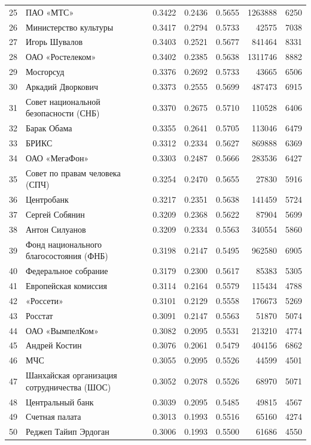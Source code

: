 {\begin{longtable}{r >{\raggedright\arraybackslash}p{4.2cm} S[table-format=1.4] S[table-format=1.4] S[table-format=1.4] r r}
25 & ПАО «МТС» & 0.3422 & 0.2436 & 0.5655 & 1263888 & 6250 \\
26 & Министерство культуры & 0.3417 & 0.2794 & 0.5733 & 42575 & 7038 \\
27 & Игорь Шувалов & 0.3403 & 0.2521 & 0.5677 & 841464 & 8331 \\
28 & ОАО «Ростелеком» & 0.3402 & 0.2385 & 0.5638 & 1311746 & 8882 \\
29 & Мосгорсуд & 0.3376 & 0.2692 & 0.5733 & 43665 & 6506 \\
30 & Аркадий Дворкович & 0.3373 & 0.2555 & 0.5699 & 487473 & 6915 \\
31 & Совет национальной безопасности (СНБ) & 0.3370 & 0.2675 & 0.5710 & 110528 & 6406 \\
32 & Барак Обама & 0.3355 & 0.2641 & 0.5705 & 113046 & 6479 \\
33 & БРИКС & 0.3312 & 0.2334 & 0.5627 & 869888 & 6369 \\
34 & ОАО «МегаФон» & 0.3303 & 0.2487 & 0.5666 & 283536 & 6427 \\
35 & Совет по правам человека (СПЧ) & 0.3254 & 0.2470 & 0.5655 & 27830 & 5916 \\
36 & Центробанк & 0.3217 & 0.2351 & 0.5638 & 141459 & 5724 \\
37 & Сергей Собянин & 0.3209 & 0.2368 & 0.5622 & 87904 & 5699 \\
38 & Антон Силуанов & 0.3209 & 0.2334 & 0.5563 & 340554 & 5860 \\
39 & Фонд национального благосостояния (ФНБ) & 0.3198 & 0.2147 & 0.5495 & 962580 & 6905 \\
40 & Федеральное собрание & 0.3179 & 0.2300 & 0.5617 & 85383 & 5305 \\
41 & Европейская комиссия & 0.3114 & 0.2164 & 0.5579 & 115434 & 4788 \\
42 & «Россети» & 0.3101 & 0.2129 & 0.5558 & 176673 & 5269 \\
43 & Росстат & 0.3091 & 0.2147 & 0.5563 & 51870 & 5074 \\
44 & ОАО «ВымпелКом» & 0.3082 & 0.2095 & 0.5531 & 213210 & 4774 \\
45 & Андрей Костин & 0.3076 & 0.2061 & 0.5479 & 404156 & 6862 \\
46 & МЧС & 0.3055 & 0.2095 & 0.5526 & 44599 & 4501 \\
47 & Шанхайская организация сотрудничества (ШОС) & 0.3052 & 0.2078 & 0.5526 & 68970 & 5071 \\
48 & Центральный банк & 0.3039 & 0.2095 & 0.5485 & 49815 & 4567 \\
49 & Счетная палата & 0.3013 & 0.1993 & 0.5516 & 65160 & 4274 \\
50 & Реджеп Тайип Эрдоган & 0.3006 & 0.1993 & 0.5500 & 61686 & 4550 \\
\end{longtable}
}

